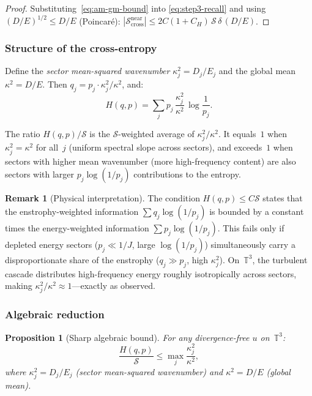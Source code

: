 \documentclass[11pt]{article}
\newtheorem{proposition}[theorem]{Proposition}
\theoremstyle{definition}
\newtheorem{remark}[theorem]{Remark}
\newcommand{\T}{\mathbb{T}}
\newcommand{\cS}{\mathcal{S}}
\begin{document}
\begin{proof}
Substituting~\eqref{eq:am-gm-bound} into
\eqref{eq:step3-recall} and using $(D/E)^{1/2} \leq D/E$
(Poincar\'e):
$|\cS_{\mathrm{cross}}^{\mathrm{near}}|
\leq 2C(1+C_H)\,\cS\,\delta\,(D/E)$.
\end{proof}


\subsubsection{Structure of the cross-entropy}

Define the \emph{sector mean-squared wavenumber}
$\kappa_j^2 = D_j/E_j$ and the global mean
$\kappa^2 = D/E$.  Then
$q_j = p_j\cdot\kappa_j^2/\kappa^2$, and:
\begin{equation}\label{eq:H-kappa}
H(q,p) = \sum_j p_j\,\frac{\kappa_j^2}{\kappa^2}\,
\log\frac{1}{p_j}.
\end{equation}

The ratio $H(q,p)/\cS$ is the $\cS$-weighted average of
$\kappa_j^2/\kappa^2$.  It equals~$1$ when
$\kappa_j^2 = \kappa^2$ for all~$j$ (uniform spectral slope
across sectors), and exceeds~$1$ when sectors with higher
mean wavenumber (more high-frequency content) are also
sectors with larger $p_j\log(1/p_j)$ contributions to the
entropy.

\begin{remark}[Physical interpretation]
The condition $H(q,p) \leq C\cS$ states that the
enstrophy-weighted information $\sum q_j\log(1/p_j)$ is
bounded by a constant times the energy-weighted information
$\sum p_j\log(1/p_j)$.  This fails only if depleted
energy sectors ($p_j \ll 1/J$, large $\log(1/p_j)$)
simultaneously carry a disproportionate share of the
enstrophy ($q_j \gg p_j$, high $\kappa_j^2$).
On~$\T^3$, the turbulent cascade distributes high-frequency
energy roughly isotropically across sectors, making
$\kappa_j^2/\kappa^2 \approx 1$---exactly as observed.
\end{remark}


\subsubsection{Algebraic reduction}

\begin{proposition}[Sharp algebraic bound]
\label{prop:H-kappa-bound}
For any divergence-free $u$ on~$\T^3$:
\begin{equation}\label{eq:H-kappa-sharp}
\frac{H(q,p)}{\cS} \leq \max_j
\frac{\kappa_j^2}{\kappa^2},
\end{equation}
where $\kappa_j^2 = D_j/E_j$ (sector mean-squared
wavenumber) and $\kappa^2 = D/E$ (global mean).
\end{proposition}
\end{document}
